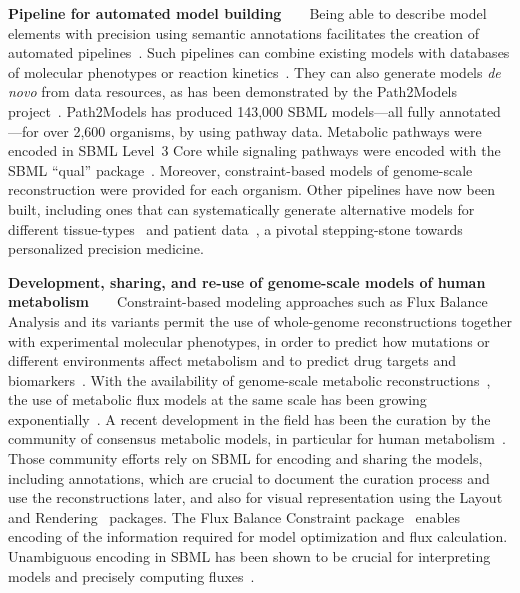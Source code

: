 \documentclass{sbml-paper}
\begin{document}
\textbf{Pipeline for automated model building}~~~~Being able to describe model elements with precision using semantic annotations facilitates the creation of automated pipelines~\citep{Drager2010automating}. Such pipelines can combine existing models with databases of molecular phenotypes or reaction kinetics~\citep{li2010systematic}.  They can also generate models \emph{de novo} from data resources, as has been demonstrated by the Path2Models project~\citep{buchel2013path2models}. Path2Models has produced 143,000 SBML models---all fully annotated---for over 2,600 organisms, by using pathway data. Metabolic pathways were encoded in SBML Level~3 Core while signaling pathways were encoded with the SBML ``qual'' package~\citep{chaouiya2013sbml}. Moreover, constraint-based models of genome-scale reconstruction were provided for each organism. Other pipelines have now been built, including ones that can systematically generate alternative models for different tissue-types~\citep{wang2012reconstruction,thiele2013community} and patient data~\citep{uhlen2017pathology}, a pivotal stepping-stone towards personalized precision medicine.

\textbf{Development, sharing, and re-use of genome-scale models of human metabolism}~~~~Constraint-based modeling approaches such as Flux Balance Analysis and its variants permit the use of whole-genome reconstructions together with experimental molecular phenotypes, in order to predict how mutations or different environments affect metabolism and to predict drug targets and biomarkers~\citep{savinell1992network, obrien2015}.  With the availability of genome-scale metabolic reconstructions~\citep{edwards1999systems}, the use of metabolic flux models at the same scale has been growing exponentially~\citep{Bordbar2014a}. A recent development in the field has been the curation by the community of consensus metabolic models, in particular for human metabolism~\citep{brunk2018}. Those community efforts rely on SBML for encoding and sharing the models, including annotations, which are crucial to document the curation process and use the reconstructions later, and also for visual representation using the Layout~\citep{Gauges2015} and Rendering~\citep{Bergmann2018sbml} packages. The Flux Balance Constraint package~\citep{Olivier2018a} enables encoding of the information required for model optimization and flux calculation.  Unambiguous encoding in SBML has been shown to be crucial for interpreting models and precisely computing fluxes~\citep{Ebrahim2015, Ravikrishnan2015critical}.
\end{document}
